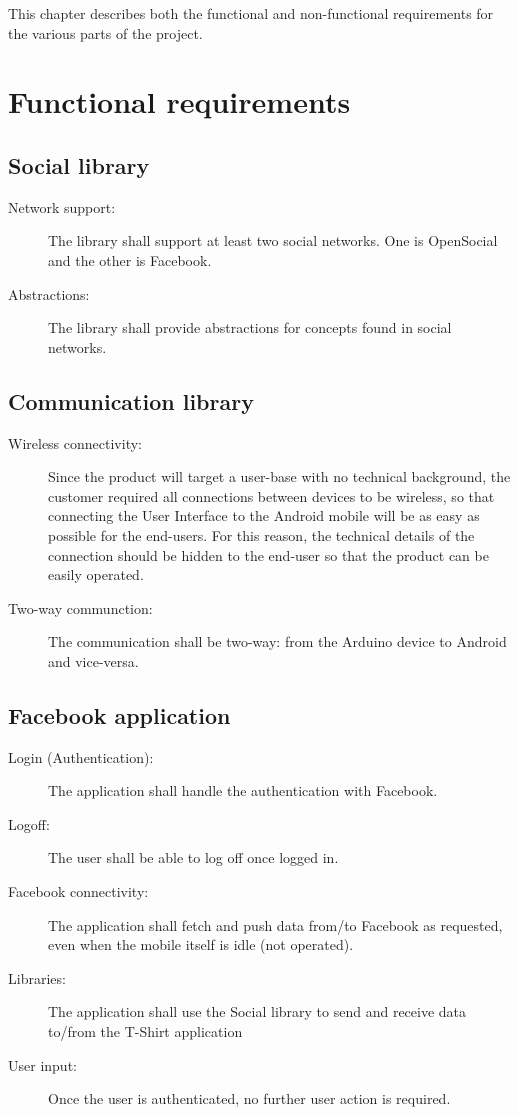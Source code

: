 
This chapter describes both the functional and non-functional requirements
for the various parts of the project.

\section{Functional requirements}
	
	\subsection{Social library}
	\begin{description}
		\item[Network support:] The library shall support at least two social networks.
		One is OpenSocial and the other is Facebook.
		\item[Abstractions:] The library shall provide abstractions for concepts found
		in social networks.
		\item[]
	\end{description}
	
	\subsection{Communication library}
	\begin{description}
		\item[Wireless connectivity:] Since the product will target a user-base with
		no technical background, the customer required all connections between
		devices to be wireless, so that connecting the User Interface to the Android
		mobile will be as easy as possible for the end-users. For this reason, the technical
		details of the connection should be hidden to the end-user so that the product can
		be easily operated.
		\item[Two-way communction:] The communication shall be two-way: from the
		Arduino device to Android and vice-versa.
	\end{description}

	\newpage

	\subsection{Facebook application}

	\begin{description}
		\item[Login (Authentication):] The application shall handle the authentication with Facebook.
		\item[Logoff:] The user shall be able to log off once logged in.
		\item[Facebook connectivity:] The application shall fetch and push data
		from/to Facebook as requested, even when the mobile itself is idle (not operated).
		\item[Libraries:] The application shall use the Social library to send and receive
		data to/from the T-Shirt application
		\item[User input:] Once the user is authenticated, no further user action is required.
	\end{description}

